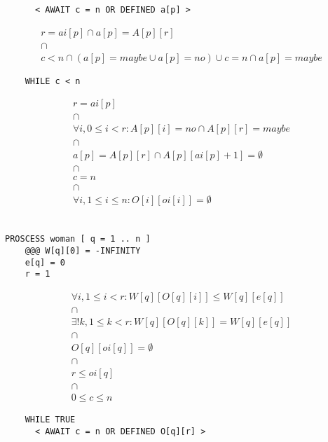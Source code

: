 \documentclass{article}
\begin{document}
\begin{verbatim}
      < AWAIT c = n OR DEFINED a[p] >
\end{verbatim}
\begin{displaymath}
\begin{array}{c}
r = ai[p] \cap a[p] = A[p][r] \\
\cap \\
c < n \cap (a[p] = maybe \cup a[p] = no) \cup c = n \cap a[p] =  maybe
\end{array}
\end{displaymath}
\begin{verbatim}
    WHILE c < n
\end{verbatim}
\begin{displaymath}
\begin{array}{c}
r = ai[p] \\
\cap \\
\forall i, 0 \leq i < r : A[p][i] = no \cap A[p][r] = maybe\\
\cap \\
a[p] = A[p][r] \cap A[p][ai[p] + 1] = \emptyset \\
\cap \\
c = n \\
\cap \\
\forall i, 1 \leq i \leq n : O[i][oi[i]] = \emptyset\\
\end{array}
\end{displaymath}
\begin{verbatim}

PROSCESS woman [ q = 1 .. n ]
    @@@ W[q][0] = -INFINITY
    e[q] = 0
    r = 1
\end{verbatim}
\begin{displaymath}
\begin{array}{c}
\forall i, 1 \leq i < r : W[q][O[q][i]] \leq W[q][e[q]] \\
\cap \\
\exists ! k, 1 \leq k < r : W[q][O[q][k]] = W[q][e[q]] \\
\cap \\
O[q][oi[q]] = \emptyset \\
\cap \\
r \leq oi[q] \\
\cap \\
0 \leq c \leq n
\end{array}
\end{displaymath}
\begin{verbatim}
    WHILE TRUE
      < AWAIT c = n OR DEFINED O[q][r] >
\end{verbatim}
\end{document}
